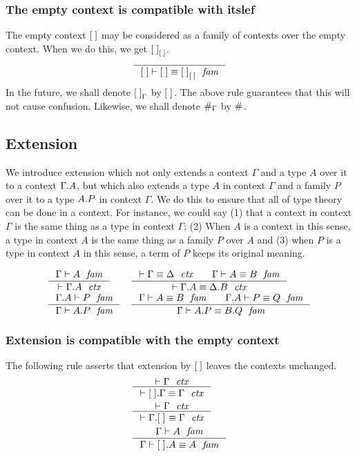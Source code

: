 \subsubsection{The empty context is compatible with itslef}
The empty context $\emptyc$ may be considered as a family of contexts over the empty
context. When we do this, we get $\emptyf[\emptyc]$.
\begin{equation}
\inference{}{\jfameq{\emptyc}{\emptyc}{\emptyf[\emptyc]}}
\end{equation}
In the future, we shall denote $\emptyf[\Gamma]$ by $\emptyf$. The above rule
guarantees that this will not cause confusion. Likewise, we shall denote
$\emptytm[\Gamma]$ by $\emptytm$.

\subsection{Extension}
We introduce extension which not only extends a context $\Gamma$ and a type
$A$ over it to a context $\ctxext{\Gamma}{A}$, but which also extends a type $A$
in context $\Gamma$ and a family $P$ over it to a type $\ctxext{A}{P}$ in context
$\Gamma$. We do this to ensure that all of type theory can be done in a context.
For instance, we could say (1) that a context in context $\Gamma$ is the same thing
as a type in context $\Gamma$; (2) When $A$ is a context in this sense, a type in
context $A$ is the same thing as a family $P$ over $A$ and (3) when $P$ is a type
in context $A$ in this sense, a term of $P$ keeps its original meaning.

\begin{align}
& \inference{\jfam{\Gamma}{A}}{\jctx{\ctxext{\Gamma}{A}}}
& & \inference{\jctxeq{\Gamma}{\Delta}\qquad\jfameq{\Gamma}{A}{B}}{\jctxeq{\ctxext{\Gamma}{A}}{\ctxext{\Delta}{B}}}\\
& \inference{\jfam{\ctxext{\Gamma}{A}}{P}}{\jfam{\Gamma}{\ctxext{A}{P}}}
& & \inference{\jfameq{\Gamma}{A}{B}\qquad\jfameq{\ctxext{\Gamma}{A}}{P}{Q}}{\jfameq{\Gamma}{\ctxext{A}{P}}{\ctxext{B}{Q}}}
\end{align}

\subsubsection{Extension is compatible with the empty context}
The following rule asserts that extension by $\emptyc$ leaves the contexts unchanged.
\begin{align}
& \inference{\jctx{\Gamma}}{\jctxeq{\ctxext{\emptyc}{\Gamma}}{\Gamma}}\\
& \inference{\jctx{\Gamma}}{\jctxeq{\ctxext{\Gamma}{\emptyf}}{\Gamma}}\\
& \inference{\jfam{\Gamma}{A}}{\jfameq{\Gamma}{\ctxext{\emptyf}{A}}{A}}
\end{align}

